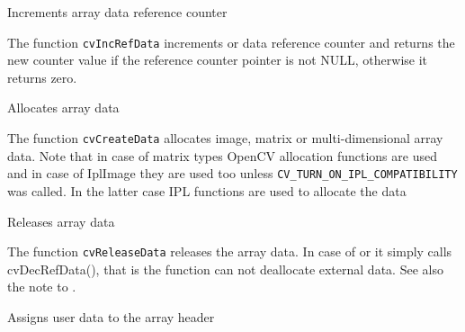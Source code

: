 
\label{IncRefData}

Increments array data reference counter


\begin{description}
\end{description}


The function \texttt{cvIncRefData} increments  or
 data reference counter and returns the new counter value
if the reference counter pointer is not NULL, otherwise it returns zero.

\label{CreateData}

Allocates array data


\begin{description}
\end{description}


The function \texttt{cvCreateData} allocates image, matrix or
multi-dimensional array data. Note that in case of matrix types OpenCV
allocation functions are used and in case of IplImage they are used
too unless \texttt{CV\_TURN\_ON\_IPL\_COMPATIBILITY} was called. In the
latter case IPL functions are used to allocate the data

\label{ReleaseData}

Releases array data


\begin{description}
\end{description}


The function \texttt{cvReleaseData} releases the array data. In case of  or  it simply calls cvDecRefData(), that is the function can not deallocate external data. See also the note to .

\label{SetData}

Assigns user data to the array header

